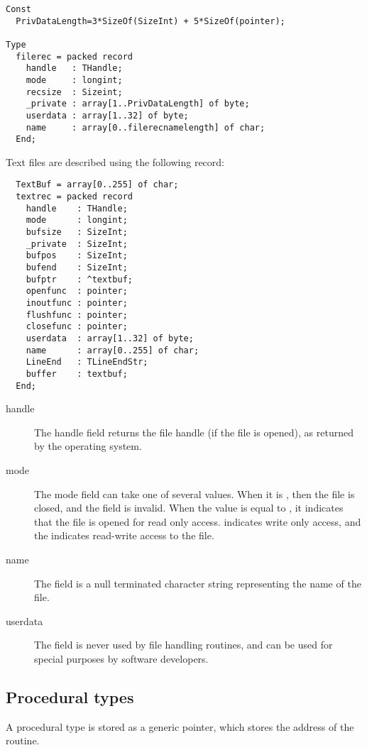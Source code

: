 \begin{verbatim}
Const
  PrivDataLength=3*SizeOf(SizeInt) + 5*SizeOf(pointer);

Type
  filerec = packed record
    handle   : THandle;
    mode     : longint;
    recsize  : Sizeint;
    _private : array[1..PrivDataLength] of byte;
    userdata : array[1..32] of byte;
    name     : array[0..filerecnamelength] of char;
  End;
\end{verbatim}

Text files are described using the following record:

\begin{verbatim}
  TextBuf = array[0..255] of char;
  textrec = packed record
    handle    : THandle;
    mode      : longint;
    bufsize   : SizeInt;
    _private  : SizeInt;
    bufpos    : SizeInt;
    bufend    : SizeInt;
    bufptr    : ^textbuf;
    openfunc  : pointer;
    inoutfunc : pointer;
    flushfunc : pointer;
    closefunc : pointer;
    userdata  : array[1..32] of byte;
    name      : array[0..255] of char;
    LineEnd   : TLineEndStr;
    buffer    : textbuf;
  End;
\end{verbatim}

\begin{description}
\item[handle] The handle field returns the file handle (if the file is
opened), as returned by the operating system.

\item[mode] The mode field can take one of several values. When it is
, then the file is closed, and the  field is invalid.
When the value is equal to , it indicates that the file is
opened for read only access.  indicates write only access,
and the  indicates read-write access to the file.

\item[name] The  field is a null terminated character string representing
the name of the file.

\item[userdata] The  field is never used by \fpc file handling
routines, and can be used for special purposes by software developers.
\end{description}

\subsection{Procedural types}
A procedural type is stored as a generic pointer, which stores
the address of the routine.

